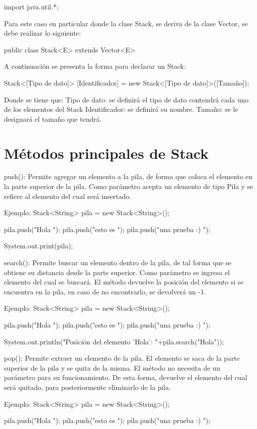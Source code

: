 \documentclass[12pt, letterpaper]{article} %
\begin{document}
import java.util.*;

Para este caso en particular donde la clase Stack, se deriva de la clase Vector, se debe realizar lo siguiente:

public class Stack<E> extends Vector<E>

A continuación se presenta la forma para declarar un Stack:

Stack<[Tipo de dato]> [Identificador] = new Stack<[Tipo de dato]>([Tamaño]);

Donde se tiene que:
Tipo de dato: se definirá el tipo de dato contendrá cada uno de los elementos del Stack
Identificador: se definirá su nombre.
Tamaño: se le designará el tamaño que tendrá.

\section*{Métodos principales de Stack}
push():
Permite agregar un elemento a la pila, de forma que coloca el elemento en la parte superior de la pila. Como parámetro acepta un elemento de tipo Pila y se refiere al elemento del cual será insertado. 

Ejemplo:
Stack<String> pila = new Stack<String>();

pila.push("Hola ");
pila.push("esto es ");
pila.push("una prueba :) ");

System.out.print(pila);


search():
Permite buscar un elemento dentro de la pila, de tal forma que se obtiene su distancia desde la parte superior. Como parámetro se ingresa el elemento del cual se buscará. El método devuelve la posición del elemento si se encuentra en la pila, en caso de no encontrarlo, se devolverá un -1. 

Ejemplo:
Stack<String> pila = new Stack<String>();

pila.push("Hola ");
pila.push("esto es ");
pila.push("una prueba :) ");

System.out.println("Posición del elemento 'Hola':  "+pila.search("Hola"));


pop():
Permite extraer un elemento de la pila. El elemento se saca de la parte superior de la pila y se quita de la misma. El método no necesita de un parámetro para su funcionamiento. De esta forma, devuelve el elemento del cual será quitado, para posteriormente eliminarlo de la pila. 

Ejemplo:
Stack<String> pila = new Stack<String>();

pila.push("Hola ");
pila.push("esto es ");
pila.push("una prueba :) ");
\end{document}
